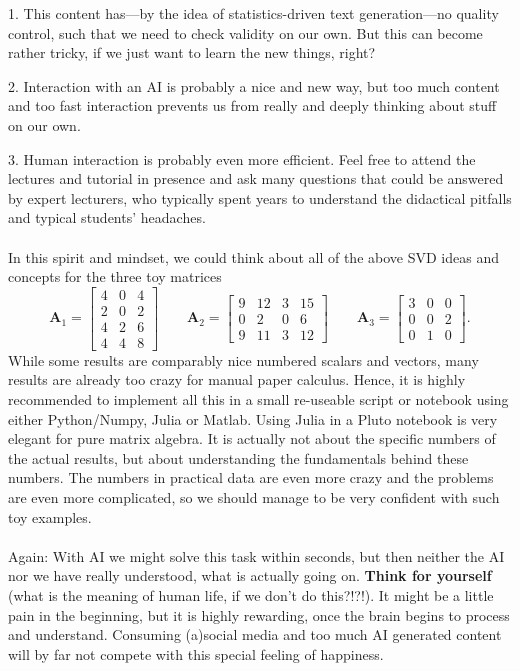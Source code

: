 \documentclass[a4paper, 11pt]{scrartcl}
\begin{document}
1. This content has---by the idea of statistics-driven text generation---no quality control,
such that we need to check validity on our own. But this can become rather tricky, if we just want to learn the new things, right?

2. Interaction with an AI is probably a nice and new way, but too much content and too fast interaction prevents us from really and deeply thinking about stuff on our own.

3. Human interaction is probably even more efficient. Feel free to attend the lectures and tutorial in presence and ask many questions that could be answered by expert lecturers, who typically spent years to understand
the didactical pitfalls and typical students' headaches.
\\\\\noindent In this spirit and mindset, we could think about all of the above SVD ideas and concepts for the three toy matrices
$$
\bm{A}_1 =
\begin{bmatrix}
4 & 0 & 4\\
2 & 0 & 2\\
4 & 2 & 6\\
4 & 4 & 8
\end{bmatrix}
\qquad
\bm{A}_2 =
\begin{bmatrix}
9 & 12 & 3 & 15\\
0 & 2 & 0 & 6\\
9 & 11 & 3 & 12
\end{bmatrix}
\qquad
\bm{A}_3 =
\begin{bmatrix}
3 & 0 & 0\\
0 & 0 & 2\\
0 & 1 & 0
\end{bmatrix}.
$$
While some results are comparably nice numbered scalars and vectors, many results are already too crazy for manual paper calculus.
%
Hence, it is highly recommended to implement all this in a small re-useable script or notebook using either Python/Numpy, Julia or Matlab. Using Julia in a Pluto notebook is very elegant for pure matrix algebra.
%
It is actually not about the specific numbers of the actual results, but about understanding the fundamentals behind these numbers.
%
The numbers in practical data are even more crazy and the problems are even more complicated, so we should manage to be very confident with such toy examples.
\\\\\noindent Again: With AI we might solve this task within seconds, but then neither the AI nor we have really understood, what is actually going on.
\textbf{Think for yourself} (what is the meaning of human life, if we don't do this?!?!).
It might be a little pain in the beginning, but it is highly rewarding,
once the brain begins to process and understand. Consuming (a)social media and too much AI generated content will by far not compete with this special feeling of happiness.
\end{document}
